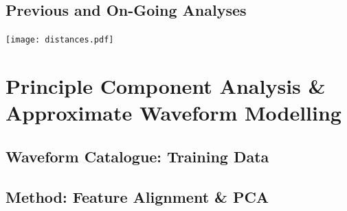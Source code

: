 \documentclass[a0,landscape]{a0poster}
\begin{document}
\begin{multicols}{4}
\subsection*{Previous and On-Going Analyses}

\begin{center}%
    \texttt{[image: distances.pdf]}
\end{center}%

\section*{\centering Principle Component Analysis \& Approximate Waveform Modelling}

\subsection*{Waveform Catalogue: Training Data}

\subsection*{Method: Feature Alignment \& PCA}

%
%


\end{multicols}
\end{document}
